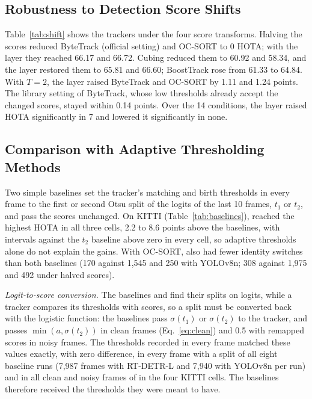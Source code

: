 







\subsection{Robustness to Detection Score Shifts}\label{sec:shift}
Table~\ref{tab:shift} shows the trackers under the four score transforms. Halving the scores
reduced ByteTrack (official setting) and OC-SORT to 0 HOTA; with the layer they reached 66.17 and
66.72. Cubing reduced them to 60.92 and 58.34, and the layer restored them to 65.81 and 66.60;
BoostTrack rose from 61.33 to 64.84. With $T=2$, the layer raised ByteTrack and OC-SORT by 1.11 and
1.24 points. The library setting of ByteTrack, whose low thresholds already accept the changed
scores, stayed within 0.14 points. Over the 14 conditions, the layer raised HOTA significantly in 7
and lowered it significantly in none.


\subsection{Comparison with Adaptive Thresholding Methods}\label{sec:baselines}
Two simple baselines set the tracker's matching and birth thresholds in every frame to the first or
second Otsu split of the logits of the last 10 frames, $t_1$ or $t_2$, and pass the scores
unchanged. On KITTI (Table~\ref{tab:baselines}), \scl{} reached the highest HOTA in all three
cells, 2.2 to 8.6 points above the baselines, with intervals against the $t_2$ baseline above zero
in every cell, so adaptive thresholds alone do not explain the gains. With OC-SORT, \scl{} also had
fewer identity switches than both baselines (170 against 1,545 and 250 with YOLOv8n; 308 against
1,975 and 492 under halved scores).

\emph{Logit-to-score conversion.} The baselines and \scl{} find their splits on logits, while a
tracker compares its thresholds with scores, so a split must be converted back with the logistic
function: the baselines pass $\sigma(t_1)$ or $\sigma(t_2)$ to the tracker, and \scl{} passes
$\min(a,\sigma(t_2))$ in clean frames (Eq.~\eqref{eq:clean}) and 0.5 with remapped scores in noisy
frames. The thresholds recorded in every frame matched these values exactly, with zero difference,
in every frame with a split of all eight baseline runs (7,987 frames with RT-DETR-L and 7,940
with YOLOv8n per run) and in all clean and noisy frames of \scl{} in the four KITTI cells. The baselines therefore received the thresholds they were meant to have.

